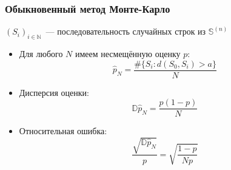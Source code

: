 \documentclass[pdf, 10pt, unicode]{beamer}
\begin{document}
	
	\begin{frame}\frametitle{Обыкновенный метод Монте-Карло}

			 $(S_i)_{i \in \mathbb{N}}$~--- последовательность случайных строк из $\mathbb{S}^{(n)}$
			\begin{itemize}
			 \item Для любого $N$ имеем несмещённую оценку $p$:
			\begin{equation*}
				\hat{p}_{N} = \frac{\#\{S_i : d(S_0, S_i) > a\}}{N}
			\end{equation*} 
			
		\item	 Дисперсия оценки: 
			\begin{equation*}
				\mathbb{D}\hat{p}_N = \frac{p(1-p)}{N}
			\end{equation*}
			
		\item	 Относительная ошибка: 
			\begin{equation*}
				\frac{\sqrt{\mathbb{D}\hat{p}_{N}}}{p} = \sqrt{\frac{1-p}{Np}}
			\end{equation*}
			
		\end{itemize}	 
		\end{frame}

\end{document}
